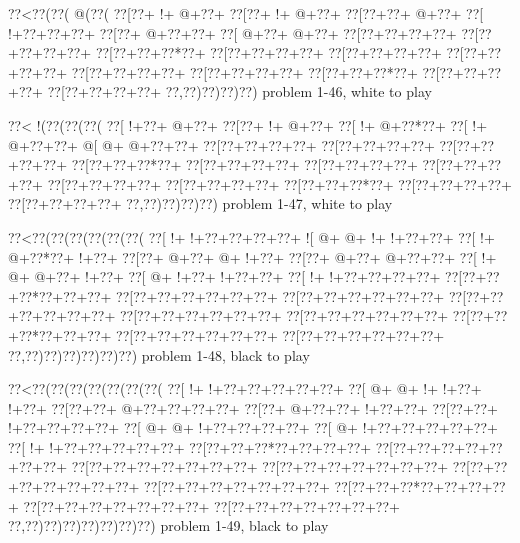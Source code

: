 \vbox{\vbox{\goo
\0??<\0??(\0??(\- @(\0??(
\0??[\0??+\- !+\- @+\0??+
\0??[\0??+\- !+\- @+\0??+
\0??[\0??+\0??+\- @+\0??+
\0??[\- !+\0??+\0??+\0??+
\0??[\0??+\- @+\0??+\0??+
\0??[\- @+\0??+\- @+\0??+
\0??[\0??+\0??+\0??+\0??+
\0??[\0??+\0??+\0??+\0??+
\0??[\0??+\0??+\0??*\0??+
\0??[\0??+\0??+\0??+\0??+
\0??[\0??+\0??+\0??+\0??+
\0??[\0??+\0??+\0??+\0??+
\0??[\0??+\0??+\0??+\0??+
\0??[\0??+\0??+\0??+\0??+
\0??[\0??+\0??+\0??*\0??+
\0??[\0??+\0??+\0??+\0??+
\0??[\0??+\0??+\0??+\0??+
\0??,\0??)\0??)\0??)\0??)
}
\hfil problem 1-46, white to play\hfil\break
}

\vbox{\vbox{\goo
\0??<\- !(\0??(\0??(\0??(
\0??[\- !+\0??+\- @+\0??+
\0??[\0??+\- !+\- @+\0??+
\0??[\- !+\- @+\0??*\0??+
\0??[\- !+\- @+\0??+\0??+
\- @[\- @+\- @+\0??+\0??+
\0??[\0??+\0??+\0??+\0??+
\0??[\0??+\0??+\0??+\0??+
\0??[\0??+\0??+\0??+\0??+
\0??[\0??+\0??+\0??*\0??+
\0??[\0??+\0??+\0??+\0??+
\0??[\0??+\0??+\0??+\0??+
\0??[\0??+\0??+\0??+\0??+
\0??[\0??+\0??+\0??+\0??+
\0??[\0??+\0??+\0??+\0??+
\0??[\0??+\0??+\0??*\0??+
\0??[\0??+\0??+\0??+\0??+
\0??[\0??+\0??+\0??+\0??+
\0??,\0??)\0??)\0??)\0??)
}
\hfil problem 1-47, white to play\hfil\break
}

\vbox{\vbox{\goo
\0??<\0??(\0??(\0??(\0??(\0??(\0??(
\0??[\- !+\- !+\0??+\0??+\0??+\0??+
\- ![\- @+\- @+\- !+\- !+\0??+\0??+
\0??[\- !+\- @+\0??*\0??+\- !+\0??+
\0??[\0??+\- @+\0??+\- @+\- !+\0??+
\0??[\0??+\- @+\0??+\- @+\0??+\0??+
\0??[\- !+\- @+\- @+\0??+\- !+\0??+
\0??[\- @+\- !+\0??+\- !+\0??+\0??+
\0??[\- !+\- !+\0??+\0??+\0??+\0??+
\0??[\0??+\0??+\0??*\0??+\0??+\0??+
\0??[\0??+\0??+\0??+\0??+\0??+\0??+
\0??[\0??+\0??+\0??+\0??+\0??+\0??+
\0??[\0??+\0??+\0??+\0??+\0??+\0??+
\0??[\0??+\0??+\0??+\0??+\0??+\0??+
\0??[\0??+\0??+\0??+\0??+\0??+\0??+
\0??[\0??+\0??+\0??*\0??+\0??+\0??+
\0??[\0??+\0??+\0??+\0??+\0??+\0??+
\0??[\0??+\0??+\0??+\0??+\0??+\0??+
\0??,\0??)\0??)\0??)\0??)\0??)\0??)
}
\hfil problem 1-48, black to play\hfil\break
}

\vbox{\vbox{\goo
\0??<\0??(\0??(\0??(\0??(\0??(\0??(\0??(
\0??[\- !+\- !+\0??+\0??+\0??+\0??+\0??+
\0??[\- @+\- @+\- !+\- !+\0??+\- !+\0??+
\0??[\0??+\0??+\- @+\0??+\0??+\0??+\0??+
\0??[\0??+\- @+\0??+\0??+\- !+\0??+\0??+
\0??[\0??+\0??+\- !+\0??+\0??+\0??+\0??+
\0??[\- @+\- @+\- !+\0??+\0??+\0??+\0??+
\0??[\- @+\- !+\0??+\0??+\0??+\0??+\0??+
\0??[\- !+\- !+\0??+\0??+\0??+\0??+\0??+
\0??[\0??+\0??+\0??*\0??+\0??+\0??+\0??+
\0??[\0??+\0??+\0??+\0??+\0??+\0??+\0??+
\0??[\0??+\0??+\0??+\0??+\0??+\0??+\0??+
\0??[\0??+\0??+\0??+\0??+\0??+\0??+\0??+
\0??[\0??+\0??+\0??+\0??+\0??+\0??+\0??+
\0??[\0??+\0??+\0??+\0??+\0??+\0??+\0??+
\0??[\0??+\0??+\0??*\0??+\0??+\0??+\0??+
\0??[\0??+\0??+\0??+\0??+\0??+\0??+\0??+
\0??[\0??+\0??+\0??+\0??+\0??+\0??+\0??+
\0??,\0??)\0??)\0??)\0??)\0??)\0??)\0??)
}
\hfil problem 1-49, black to play\hfil\break
}

